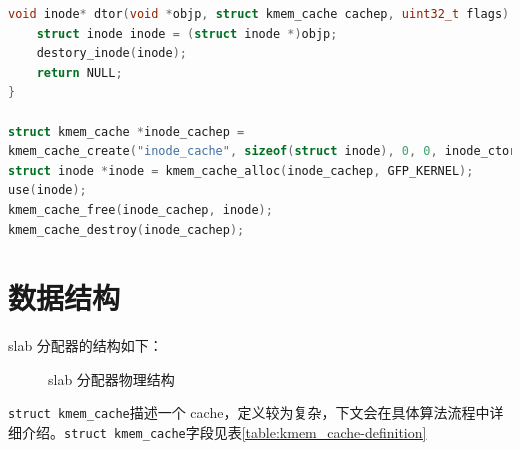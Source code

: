 \documentclass[AutoFakeBold]{LZUThesis}
\begin{document}
\begin{sloppypar}
\begin{lstlisting}[language = c]
void inode* dtor(void *objp, struct kmem_cache cachep, uint32_t flags) {
    struct inode inode = (struct inode *)objp;
    destory_inode(inode);
    return NULL;
}

struct kmem_cache *inode_cachep =
kmem_cache_create("inode_cache", sizeof(struct inode), 0, 0, inode_ctor);
struct inode *inode = kmem_cache_alloc(inode_cachep, GFP_KERNEL);
use(inode);
kmem_cache_free(inode_cachep, inode);
kmem_cache_destroy(inode_cachep);
\end{lstlisting}


\section{数据结构}

slab 分配器的结构如下：

\begin{figure}[htb]
\centering

\caption{slab 分配器物理结构}
\end{figure}

\texttt{struct\ kmem\_cache}描述一个
cache，定义较为复杂，下文会在具体算法流程中详细介绍。\texttt{struct\ kmem\_cache}字段见表\ref{table:kmem_cache-definition}


\end{sloppypar}
\end{document}
